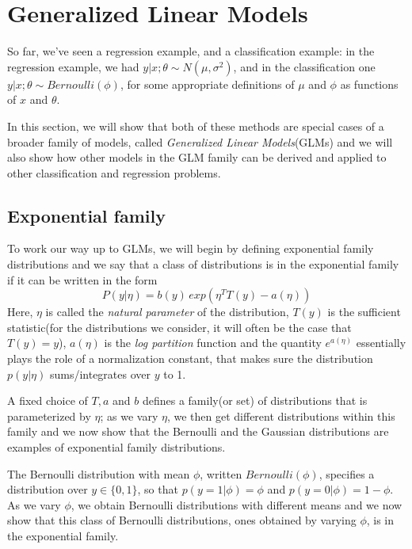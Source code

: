 \chapter{Generalized Linear Models}
So far, we’ve seen a regression example, and a classification example: in the regression example, we had
$y | x; \theta \sim N(\mu, \sigma^2)$, and in the classification one $y | x; \theta \sim Bernoulli(\phi)$,
for some appropriate definitions of $\mu$ and $\phi$ as functions of $x$ and $\theta$.

In this section, we will show that both of these methods are special cases of a broader family of models,
called \emph{Generalized Linear Models}(GLMs) and we will also show how other models in the GLM family
can be derived and applied to other classification and regression problems.

\section{Exponential family}
To work our way up to GLMs, we will begin by defining exponential family distributions and we say that
a class of distributions is in the exponential family if it can be written in the form
\[ P(y | \eta) = b(y) \, exp(\eta^T T(y) - a(\eta)) \]
Here, $\eta$ is called the \emph{natural parameter} of the distribution, $T(y)$ is the 
sufficient statistic(for the distributions we consider, it will often be the case that $T(y) = y$),
$a(\eta)$ is the \emph{log partition} function and the quantity $e^{a(\eta)}$ essentially plays the role
of a normalization constant, that makes sure the distribution $p(y | \eta)$ sums/integrates over $y$ to 1.

A fixed choice of $T,a$ and $b$ defines a family(or set) of distributions that is parameterized by $\eta$;
as we vary $\eta$, we then get different distributions within this family and we now show that the Bernoulli
and the Gaussian distributions are examples of exponential family distributions.

The Bernoulli distribution with mean $\phi$, written $Bernoulli(\phi)$, specifies a distribution 
over $y \in \{0,1\}$, so that $p(y = 1 | \phi) = \phi$ and $p(y = 0 | \phi) = 1 - \phi$.\newline
As we vary $\phi$, we obtain Bernoulli distributions with different means and we now show that this class
of Bernoulli distributions, ones obtained by varying $\phi$, is in the exponential family.

